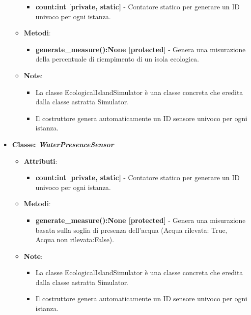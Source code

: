 \begin{itemize}
\begin{itemize}
    \begin{itemize}
        \item \textbf{count:int [private, static]} - Contatore statico per generare un ID univoco per ogni istanza.
    \end{itemize}
    \item    \textbf{Metodi}: 
    \begin{itemize}
        \item \textbf{generate\_measure():None [protected]} - Genera una misurazione della percentuale di riempimento di un isola ecologica.
    \end{itemize}
    \item    \textbf{Note}:
    \begin{itemize}
        \item La classe EcologicalIslandSimulator è una classe concreta che eredita dalla classe astratta Simulator.
        \item Il costruttore genera automaticamente un ID sensore univoco per ogni istanza.
    \end{itemize}
\end{itemize}
    \item{\textbf{Classe: \textit{WaterPresenceSensor}}}
    \begin{itemize}
        \item    \textbf{Attributi}: 
    \begin{itemize}
        \item \textbf{count:int [private, static]} - Contatore statico per generare un ID univoco per ogni istanza.
    \end{itemize}
    \item    \textbf{Metodi}: 
    \begin{itemize}
        \item \textbf{generate\_measure():None [protected]} - Genera una misurazione basata sulla soglia di presenza dell'acqua (Acqua rilevata: True, Acqua non rilevata:False).
    \end{itemize}
    \item    \textbf{Note}:
    \begin{itemize}
        \item La classe EcologicalIslandSimulator è una classe concreta che eredita dalla classe astratta Simulator.
        \item Il costruttore genera automaticamente un ID sensore univoco per ogni istanza.
    \end{itemize}
\end{itemize}

\end{itemize}
